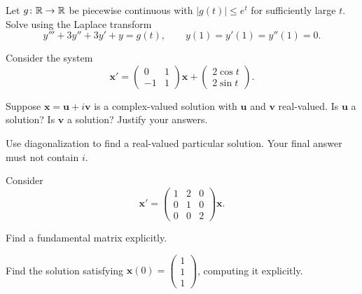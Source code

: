 \documentclass[11pt,oneside]{article}
\begin{document}
\begin{problem}
Let $g\colon\mathbb{R}\to\mathbb{R}$ be piecewise continuous with $|g(t)|\le e^t$ for sufficiently large $t$. Solve using the Laplace transform
\[
y'''+3y''+3y'+y=g(t),\qquad y(1)=y'(1)=y''(1)=0.
\]
\end{problem}

\begin{problem}
Consider the system
\[
\mathbf x'=\begin{pmatrix}0&1\\-1&1\end{pmatrix}\mathbf x+
\begin{pmatrix}2\cos t\\2\sin t\end{pmatrix}.
\]
\begin{problemsubparts}
\item Suppose $\mathbf x=\mathbf u+i\mathbf v$ is a complex-valued solution with $\mathbf u$ and $\mathbf v$ real-valued. Is $\mathbf u$ a solution? Is $\mathbf v$ a solution? Justify your answers.
\item Use diagonalization to find a real-valued particular solution. Your final answer must not contain $i$.
\end{problemsubparts}
\end{problem}

\begin{problem}
Consider
\[
\mathbf x'=\begin{pmatrix}1&2&0\\0&1&0\\0&0&2\end{pmatrix}\mathbf x.
\]
\begin{problemsubparts}
\item Find a fundamental matrix explicitly.
\item Find the solution satisfying $\displaystyle\mathbf x(0)=\begin{pmatrix}1\\1\\1\end{pmatrix}$, computing it explicitly.
\end{problemsubparts}
\end{problem}
\end{document}
